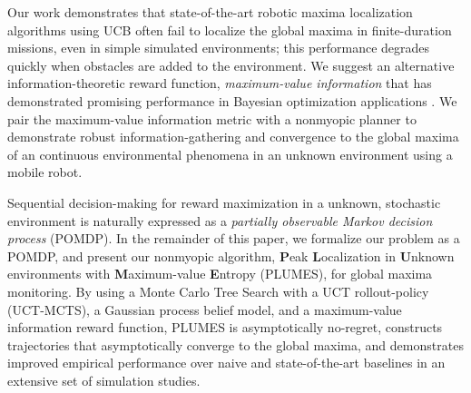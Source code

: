 \documentclass{styles/svproc}
\begin{document}
Our work demonstrates that state-of-the-art robotic maxima localization algorithms using UCB often fail to localize the global maxima in finite-duration missions, even in simple simulated environments; this performance degrades quickly when obstacles are added to the environment. We suggest an alternative information-theoretic reward function, \textit{maximum-value information} that has demonstrated promising performance in Bayesian optimization applications \cite{wang2017max}.  We pair the maximum-value information metric with a nonmyopic planner to demonstrate robust information-gathering and convergence to the global maxima of an continuous environmental phenomena in an unknown environment using a mobile robot.

%










Sequential decision-making for reward maximization in a unknown, stochastic environment is naturally expressed as a \textit{partially observable Markov decision process} (POMDP). In the remainder of this paper, we formalize our problem as a POMDP, and present our nonmyopic algorithm, \textbf{P}eak \textbf{L}ocalization in \textbf{U}nknown environments with \textbf{M}aximum-value \textbf{E}ntropy (PLUMES), for global maxima monitoring. By using a Monte Carlo Tree Search with a UCT rollout-policy (UCT-MCTS), a Gaussian process belief model, and a maximum-value information reward function, PLUMES is asymptotically no-regret, constructs trajectories that asymptotically converge to the global maxima, and demonstrates improved empirical performance over naive and state-of-the-art baselines in an extensive set of simulation studies.
\end{document}
